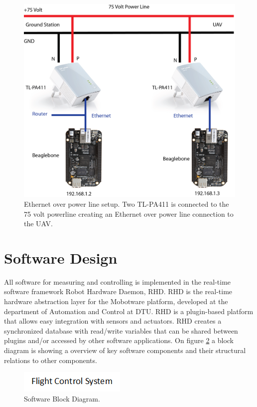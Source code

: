 \begin{figure}[hbtp]
\centering
\includegraphics[scale=0.75]{graphics/EthernetLink.png}
\caption[Ethernet over power line setup]{Ethernet over power line setup. Two TL-PA411 is connected to the 75 volt powerline creating an Ethernet over power line connection to the UAV.}
\label{fig:Networking}
\end{figure}



\section{Software Design}
All software for measuring and controlling is implemented in the real-time software framework Robot Hardware Daemon, RHD. RHD is the real-time hardware abstraction layer for the Mobotware platform, developed at the department of Automation and Control at DTU. RHD is a plugin-based platform that allows easy integration with sensors and actuators. RHD creates a synchronized database with read/write variables that can be shared between plugins and/or accessed by other software applications. On figure \ref{fig:software-block-diagram} a block diagram is showing a overview of key software components and their structural relations to other components.

\begin{figure}[hbtp]
\centering
\includegraphics[scale=0.8]{graphics/Visio/block-diagram1.png}
\caption{Software Block Diagram.}
\label{fig:software-block-diagram}
\end{figure}


